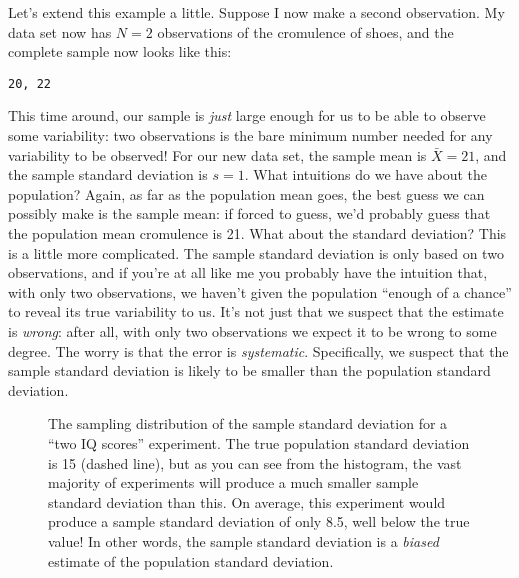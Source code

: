 Let's extend this example a little. Suppose I now make a second observation. My data set now has $N=2$ observations of the cromulence of shoes, and the complete sample now looks like this:
\begin{center}
\texttt{20, 22}
\end{center}
This time around, our sample is {\it just} large enough for us to be able to observe some variability: two observations is the bare minimum number needed for any variability to be observed! For our new data set, the sample mean is $\bar{X}=21$, and the sample standard deviation is $s=1$. What intuitions do we have about the population? Again, as far as the population mean goes, the best guess we can possibly make is the sample mean: if forced to guess, we'd probably guess that the population mean cromulence is 21. What about the standard deviation? This is a little more complicated. The sample standard deviation is only based on two observations, and if you're at all like me you probably have the intuition that, with only two observations, we haven't given the population ``enough of a chance'' to reveal its true variability to us. It's not just that we suspect that the estimate is {\it wrong}: after all, with only two observations we expect it to be wrong to some degree. The worry is that the error is {\it systematic}. Specifically, we suspect that the sample standard deviation is likely to be smaller than the population standard deviation. 

\begin{figure}[t]
\begin{center}
\caption{The sampling distribution of the sample standard deviation for a ``two IQ scores'' experiment. The true population standard deviation is 15 (dashed line), but as you can see from the histogram, the vast majority of experiments will produce a much smaller sample standard deviation than this. On average, this experiment would produce a sample standard deviation of only 8.5, well below the true value! In other words, the sample standard deviation is a {\it biased} estimate of the population standard deviation. }
\label{fig:sampdistsd}
\HR
\end{center}
\end{figure}

